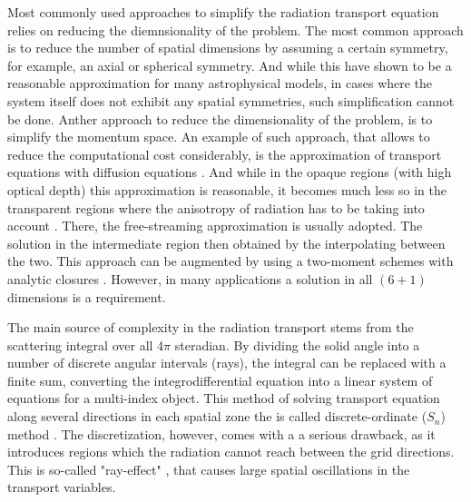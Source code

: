 Most commonly used approaches to simplify the radiation transport equation relies on reducing the diemnsionality
of the problem. The most common approach is to reduce the number of spatial dimensions by assuming a certain symmetry,
for example, an axial or spherical symmetry. And while this have shown to be a reasonable approximation for many astrophysical models, in cases where the system itself does not exhibit any spatial symmetries, 
such simplification cannot be done. 
%
Anther approach to reduce the dimensionality of the problem, is to simplify the momentum space. 
An example of such approach, that allows to reduce the computational cost considerably, is the approximation of transport equations with diffusion equations \citep{Pomraning:1973,Roe:1981}. 
And while in the opaque regions (with high optical depth) this approximation is reasonable, it becomes much less 
so in the transparent regions where the anisotropy of radiation has to be taking into account \citep{Ott:2008jb}.
There, the free-streaming approximation is usually adopted. 
%
The solution in the intermediate region then obtained by the interpolating between the two. This approach can be augmented by using a two-moment schemes with analytic closures \citep[\eg][]{Brunner:2002}.
However, in many applications a solution in all $(6+1)$ dimensions is a requirement.

The main source of complexity in the radiation transport stems from the scattering integral over all 4$\pi$ steradian.
By dividing the solid angle into a number of discrete angular intervals (rays), the integral can be replaced with a
finite sum, converting the integrodifferential equation into a linear system of equations for a multi-index object. 
%
This method of solving transport equation along several directions in each spatial zone the is called 
discrete-ordinate ($S_n$) method \citep{Castor:2004,Ott:2008jb,Sumiyoshi:2012za,Godoy:2012}. 
The discretization, however, comes with a a serious drawback, as it introduces regions which the 
radiation cannot reach between the grid directions. 
This is so-called "ray-effect" \citep{Morel:2003}, that causes large spatial oscillations in the transport variables.
%

